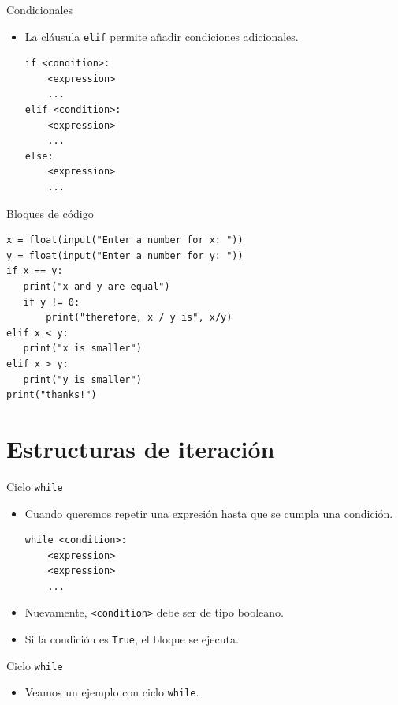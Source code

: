 \documentclass[mathserif]{beamer}
\begin{document}
\begin{frame}[fragile]{Condicionales}
    \begin{itemize}
        \item La cláusula \lstinline|elif| permite añadir condiciones adicionales.
\begin{lstlisting}
if <condition>:
    <expression>
    ...
elif <condition>:
    <expression>
    ...
else:
    <expression>
    ...
\end{lstlisting}

    \end{itemize}
\end{frame}

\begin{frame}[fragile]{Bloques de código}
\begin{lstlisting}
x = float(input("Enter a number for x: "))
y = float(input("Enter a number for y: "))
if x == y:
   print("x and y are equal")
   if y != 0:
       print("therefore, x / y is", x/y)
elif x < y:
   print("x is smaller")
elif x > y:
   print("y is smaller")
print("thanks!")
\end{lstlisting}
\end{frame}


\section{Estructuras de iteración}

\begin{frame}[fragile]{Ciclo \lstinline|while|}
    \begin{itemize}
        \item Cuando queremos repetir una expresión {\blue hasta} que se cumpla una condición. 
\begin{lstlisting}
while <condition>:
    <expression>
    <expression>
    ...
\end{lstlisting}

        \item Nuevamente, \lstinline|<condition>| debe ser de tipo booleano.
        
        \item Si la condición es \lstinline|True|, el bloque se ejecuta. 
        
    \end{itemize}
\end{frame}

\begin{frame}[fragile]{Ciclo \lstinline|while|}
    \begin{itemize}
        \item Veamos un ejemplo con ciclo \lstinline|while|.
    \end{itemize}
    
\end{frame}
\end{document}
